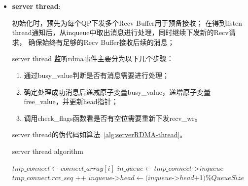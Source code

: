 {\begin{itemize}
\begin{algorithm}
\begin{algorithmic}[1]
                      \State
                      \State {}
                      \State \textbf{return}
                      \EndFunction
                  \end{algorithmic}
              \end{algorithm}
        \item \textbf{server thread}:

              初始化时，预先为每个QP下发多个Recv Buffer用于预备接收；
              在得到listen thread通知后，从inqueue中取出消息进行处理，同时继续下发新的Recv请求，
              确保始终有足够的Recv Buffer接收后续的消息；

              server thread 监听rdma事件主要分为以下几个步骤：
              \begin{enumerate}[leftmargin=*, nosep]
                  \item 通过busy\_value判断是否有消息需要进行处理；
                  \item 确定处理成功消息后递减原子变量busy\_value，递增原子变量free\_value，并更新head指针；
                  \item 调用check\_flags函数看是否有空位需要重新下发recv\_wr。
              \end{enumerate}

              server thread的伪代码如算法~\ref{alg:serverRDMA-thread}。
              \begin{algorithm}
                  \caption{server thread algorithm}\label{alg:serverRDMA-thread}
                  \begin{algorithmic}[1] %
                      \State {}

                      \State $tmp\_connect \gets connect\_array[i]$
                      \State $in\_queue \gets tmp\_connect$->$inqueue$
                      \State {}
                      \State {}
                      \State {}
                      \State $tmp\_connect.rcv\_seq$ ++
                      \EndIf
                      \State $inqueue$->$head \gets (inqueue$->$head$+1$) \% QueueSize$
                      \EndIf
                      \EndFor


\end{algorithmic}
\end{algorithm}
\end{itemize}}
